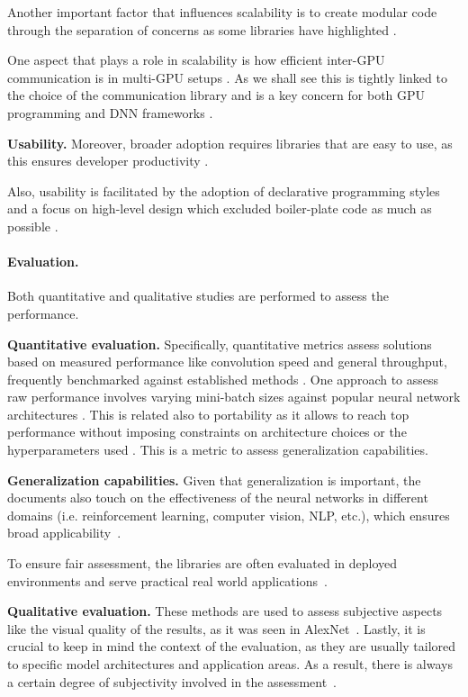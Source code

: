 Another important factor that influences scalability is to create modular code through the
separation of concerns as some libraries have highlighted .

One aspect that plays a role in scalability is how efficient inter-GPU communication is in
multi-GPU setups . As we shall see this is tightly linked to the choice of the
communication library and is a key concern for both GPU programming and DNN frameworks
\cite{noauthor_uxlfoundationoneccl_2025,noauthor_nvidianccl_2025,noauthor_rocmrccl_2025}.

\textbf{Usability.}
Moreover, broader adoption requires libraries that are easy to use, as this ensures developer productivity
.

Also, usability is facilitated by the adoption of declarative programming styles and a focus on
high-level design which excluded boiler-plate code as much as possible .

\paragraph{Evaluation.}
Both quantitative and qualitative studies are performed to assess the performance.

\textbf{Quantitative evaluation.}
Specifically, quantitative metrics assess solutions based on measured performance like convolution speed
and general throughput, frequently benchmarked against established methods .
One approach to assess raw performance involves varying mini-batch sizes against popular neural network
architectures . This is related also to portability as it allows to reach top
performance without imposing constraints on architecture choices or the hyperparameters used
. This is a metric to assess generalization capabilities.

\textbf{Generalization capabilities.}
Given that generalization is important, the documents also touch on the effectiveness of the neural
networks in different domains (i.e. reinforcement learning, computer vision, NLP, etc.), which
ensures broad applicability~.

To ensure fair assessment, the libraries are often evaluated in deployed environments and serve
practical real world applications~.

\textbf{Qualitative evaluation.}
These methods are used to assess subjective aspects like the visual quality of the results, as it was
seen in AlexNet~. Lastly, it is crucial to keep in mind the context of the evaluation,
as they are usually tailored to specific model architectures and application areas. As a result,
there is always a certain degree of subjectivity involved in the assessment~.

